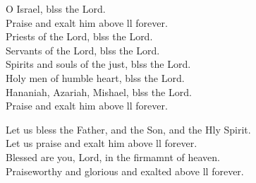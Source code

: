\begin{psalmverse}
\begin{patverse}
O Israel, blss the Lord.\Med\\
Praise and exalt him above ll forever.\\
Priests of the Lord, blss the Lord.\Med\\
Servants of the Lord, blss the Lord.\\
Spirits and souls of the just, blss the Lord.\Med\\
Holy men of humble heart, blss the Lord.\\
Hananiah, Azariah, Mishael, blss the Lord.\Med\\
Praise and exalt him above ll forever.

Let us bless the Father, and the Son, and the Hly Spirit.\Med\\
Let us praise and exalt him above ll forever.\\
Blessed are you, Lord, in the firmamnt of heaven.\Med\\
Praiseworthy and glorious and exalted above ll forever.
  \end{patverse}
\end{psalmverse}
